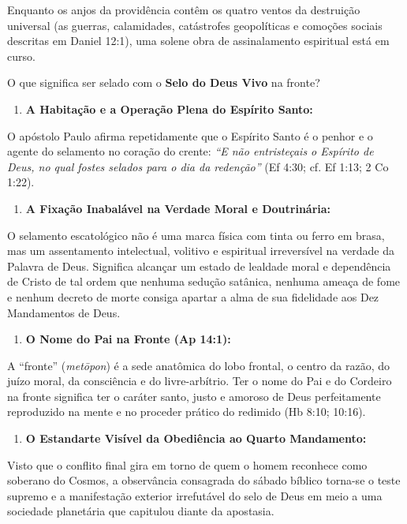 Enquanto os anjos da providência contêm os quatro ventos da destruição universal (as guerras, calamidades, catástrofes geopolíticas e comoções sociais descritas em Daniel 12:1), uma solene obra de assinalamento espiritual está em curso.

O que significa ser selado com o \textbf{Selo do Deus Vivo} na fronte?

\begin{enumerate}
  \item \textbf{A Habitação e a Operação Plena do Espírito Santo:}
\end{enumerate}

O apóstolo Paulo afirma repetidamente que o Espírito Santo é o penhor e o agente do selamento no coração do crente: \textit{``E não entristeçais o Espírito de Deus, no qual fostes selados para o dia da redenção''} (Ef 4:30; cf. Ef 1:13; 2 Co 1:22).
\begin{enumerate}
  \item \textbf{A Fixação Inabalável na Verdade Moral e Doutrinária:}
\end{enumerate}

O selamento escatológico não é uma marca física com tinta ou ferro em brasa, mas um assentamento intelectual, volitivo e espiritual irreversível na verdade da Palavra de Deus. Significa alcançar um estado de lealdade moral e dependência de Cristo de tal ordem que nenhuma sedução satânica, nenhuma ameaça de fome e nenhum decreto de morte consiga apartar a alma de sua fidelidade aos Dez Mandamentos de Deus.
\begin{enumerate}
  \item \textbf{O Nome do Pai na Fronte (Ap 14:1):}
\end{enumerate}

A ``fronte'' (\textit{metōpon}) é a sede anatômica do lobo frontal, o centro da razão, do juízo moral, da consciência e do livre-arbítrio. Ter o nome do Pai e do Cordeiro na fronte significa ter o caráter santo, justo e amoroso de Deus perfeitamente reproduzido na mente e no proceder prático do redimido (Hb 8:10; 10:16).
\begin{enumerate}
  \item \textbf{O Estandarte Visível da Obediência ao Quarto Mandamento:}
\end{enumerate}

Visto que o conflito final gira em torno de quem o homem reconhece como soberano do Cosmos, a observância consagrada do sábado bíblico torna-se o teste supremo e a manifestação exterior irrefutável do selo de Deus em meio a uma sociedade planetária que capitulou diante da apostasia.



